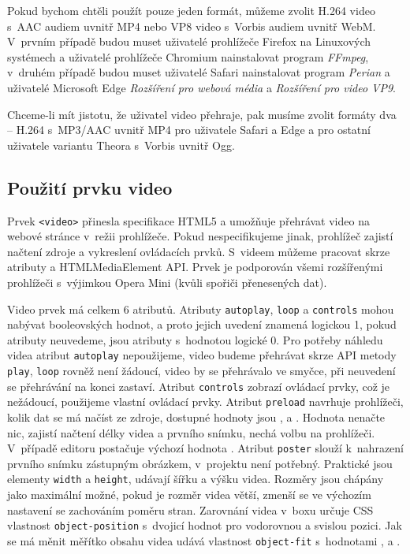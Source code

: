 Pokud bychom chtěli použít pouze jeden formát, můžeme zvolit H.264 video s~AAC audiem uvnitř MP4 nebo VP8 video s~Vorbis audiem uvnitř WebM. V~prvním případě budou muset uživatelé prohlížeče Firefox na Linuxových systémech a uživatelé prohlížeče Chromium nainstalovat program \textit{FFmpeg}, v~druhém případě budou muset uživatelé Safari nainstalovat program \textit{Perian} a uživatelé Microsoft Edge \textit{Rozšíření pro webová média} a \textit{Rozšíření pro video VP9}.

Chceme-li mít jistotu, že uživatel video přehraje, pak musíme zvolit formáty dva -- H.264 s~MP3/AAC uvnitř MP4 pro uživatele Safari a Edge a pro ostatní uživatele variantu Theora s~Vorbis uvnitř Ogg.

\subsection{Použití prvku video}
Prvek \texttt{<video>} přinesla specifikace HTML5 a umožňuje přehrávat video na webové stránce v~režii prohlížeče. Pokud nespecifikujeme jinak, prohlížeč zajistí načtení zdroje a vykreslení ovládacích prvků. S~videem můžeme pracovat skrze atributy a HTMLMediaElement API. Prvek je podporován všemi rozšířenými prohlížeči s~výjimkou Opera Mini (kvůli spořiči přenesených dat).

Video prvek má celkem 6 atributů. Atributy \texttt{autoplay}, \texttt{loop} a \texttt{controls} mohou nabývat booleovských hodnot, a proto jejich uvedení znamená logickou 1, pokud atributy neuvedeme, jsou atributy s~hodnotou logické 0. Pro potřeby náhledu videa atribut \texttt{autoplay} nepoužijeme, video budeme přehrávat skrze API metody \texttt{play}, \texttt{loop} rovněž není žádoucí, video by se přehrávalo ve smyčce, při neuvedení se přehrávání na konci zastaví. Atribut \texttt{controls} zobrazí ovládací prvky, což je nežádoucí, použijeme vlastní ovládací prvky. Atribut \texttt{preload} navrhuje prohlížeči, kolik dat se má načíst ze zdroje, dostupné hodnoty jsou ,  a . Hodnota  nenačte nic,  zajistí načtení délky videa a prvního snímku,  nechá volbu na prohlížeči. V~případě editoru postačuje výchozí hodnota . Atribut \texttt{poster} slouží k~nahrazení prvního snímku zástupným obrázkem, v~projektu není potřebný. Praktické jsou elementy \texttt{width} a \texttt{height}, udávají šířku a výšku videa. Rozměry jsou chápány jako maximální možné, pokud je rozměr videa větší, zmenší se ve výchozím nastavení se zachováním poměru stran. Zarovnání videa v~boxu určuje CSS vlastnost \texttt{object-position} s~dvojicí hodnot pro vodorovnou a svislou pozici. Jak se má měnit měřítko obsahu videa udává vlastnost \texttt{object-fit} s~hodnotami ,  a .

